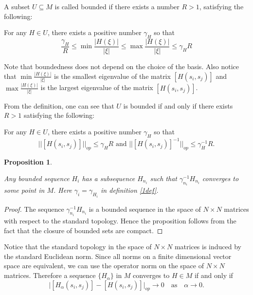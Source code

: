 \documentclass[12pt,oneside,notitlepage]{amsart}
\newtheorem{prop}[thm]{Proposition}
\theoremstyle{definition}
\theoremstyle{remark}
\numberwithin{equation}{section}
\begin{document}
\begin{Def}\label{1def} A subset $U \subseteq M$ is called bounded if there exists a number
$R>1$, satisfying the following:

For any $H \in U$, there exists a positive number $\gamma_{H}$ so
that\begin{equation}\label{eq4}\frac{\gamma_{H}}{R} \leq \min
\frac{|H(\xi)|}{|\xi|}\leq \max \frac{|H(\xi)|}{|\xi|} \leq
\gamma_{H} R
\end{equation}

\end{Def}

Note that boundedness does not depend on the choice of the basis.
Also notice that $\min \frac{|H(\xi)|}{|\xi|}$ is the smallest
eigenvalue of the matrix $[H(s_{i},s_{j})]$ and $\max
\frac{|H(\xi)|}{|\xi|}$ is the largest eigenvalue of the matrix
$[H(s_{i},s_{j})]$.

From the definition, one can see that $U$ is bounded if and only
if there exists $R>1$ satisfying the following:

For any $H \in U$, there exists a positive number $\gamma_{H}$ so
that
$$||[H(s_{i},s_{j})]||_{op}\leq \gamma_{H} R     \textrm{   and   }     ||[H(s_{i},s_{j})]^{-1}||_{op}\leq \gamma_{H}^{-1} R.$$

\begin{prop}\label{firstprop}

Any bounded sequence $H_{i}$ has a subsequence $H_{n_{i}}$ such
that $\gamma_{n_{i}}^{-1}H_{n_{i}}$ converges to some point in
$M$. Here $\gamma_{i}=\gamma_{H_{i}}$ in definition \ref{1def}.

\end{prop}

\begin{proof}

The sequence $\gamma_{n_{i}}^{-1}H_{n_{i}}$ is a bounded sequence
in the space of $N \times N$ matrices with respect to the standard
topology. Hence the proposition follows from the fact that the
closure of bounded sets are compact.

\end{proof}

Notice that the standard topology in the space of $N \times N$
matrices is induced by the standard Euclidean norm. Since all
norms on a finite dimensional vector space are equivalent, we can
use the operator norm on the space of $N \times N$ matrices.
Therefore a sequence $\{H_{\alpha}\}$ in $M$ converges to $H \in
M$ if and only if
$$\big |[H_{\alpha}(s_{i},s_{j})]-[H(s_{i},s_{j})]\big |_{op} \rightarrow 0  \,\,\,\, \textrm{    as    }  \,\,\,\, \alpha \rightarrow 0.$$
\end{document}
